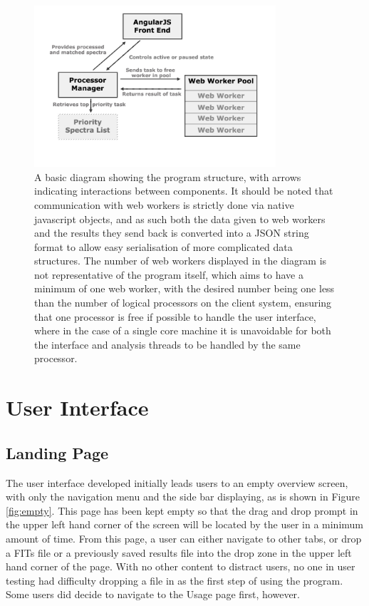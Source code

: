 \documentclass[titlesmallcaps, examinerscopy, copyrightpage]{uqthesis}
\begin{document}
\begin{figure}[ht!]
\includegraphics[width=0.8\textwidth]{images/diagram.jpg} 
\centering
\caption{A basic diagram showing the program structure, with arrows indicating interactions between components. It should be noted that communication with web workers is strictly done via native javascript objects, and as such both the data given to web workers and the results they send back is converted into a JSON string format to allow easy serialisation of more complicated data structures. The number of web workers displayed in the diagram is not representative of the program itself, which aims to have a minimum of one web worker, with the desired number being one less than the number of logical processors on the client system, ensuring that one processor is free if possible to handle the user interface, where in the case of a single core machine it is unavoidable for both the interface and analysis threads to be handled by the same processor.}
\label{fig:diagram}
\end{figure}



\section{User Interface}

\subsection{Landing Page}

The user interface developed initially leads users to an empty overview screen, with only the navigation menu and the side bar displaying, as is shown in Figure \ref{fig:empty}. This page has been kept empty so that the drag and drop prompt in the upper left hand corner of the screen will be located by the user in a minimum amount of time. From this page, a user can either navigate to other tabs, or drop a FITs file or a previously saved results file into the drop zone in the upper left hand corner of the page. With no other content to distract users, no one in user testing had difficulty dropping a file in as the first step of using the program. Some users did decide to navigate to the Usage page first, however.
\end{document}
